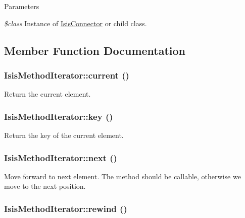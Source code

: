 \begin{DoxyParams}{Parameters}
\item[{\em \$class}]Instance of \hyperlink{classIsisConnector}{IsisConnector} or child class. \end{DoxyParams}


\subsection{Member Function Documentation}
\hypertarget{classIsisMethodIterator_a1d7236d349cd282c4c0ff6ec8f186e93}{
\subsubsection[{current}]{\setlength{\rightskip}{0pt plus 5cm}IsisMethodIterator::current ()}}
\label{classIsisMethodIterator_a1d7236d349cd282c4c0ff6ec8f186e93}
Return the current element. \hypertarget{classIsisMethodIterator_ad750f5dd57dcb6480f64f9ac703492fc}{
\subsubsection[{key}]{\setlength{\rightskip}{0pt plus 5cm}IsisMethodIterator::key ()}}
\label{classIsisMethodIterator_ad750f5dd57dcb6480f64f9ac703492fc}
Return the key of the current element. \hypertarget{classIsisMethodIterator_a8a02e17d6597ba1f199bd82ab9fc1b32}{
\subsubsection[{next}]{\setlength{\rightskip}{0pt plus 5cm}IsisMethodIterator::next ()}}
\label{classIsisMethodIterator_a8a02e17d6597ba1f199bd82ab9fc1b32}
Move forward to next element. The method should be callable, otherwise we move to the next position. \hypertarget{classIsisMethodIterator_a1a0ee1617a50e6aa57fe80cd0c2023df}{
\subsubsection[{rewind}]{\setlength{\rightskip}{0pt plus 5cm}IsisMethodIterator::rewind ()}}
